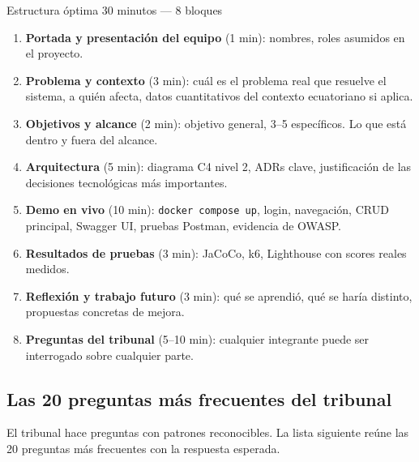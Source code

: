 \documentclass[11pt,a4paper,openany]{book}
\begin{document}
\begin{cajadefinicion}{Estructura óptima 30 minutos --- 8 bloques}
\begin{enumerate}
\item \textbf{Portada y presentación del equipo} (1 min): nombres,
roles asumidos en el proyecto.
\item \textbf{Problema y contexto} (3 min): cuál es el problema real
que resuelve el sistema, a quién afecta, datos cuantitativos del
contexto ecuatoriano si aplica.
\item \textbf{Objetivos y alcance} (2 min): objetivo general, 3--5
específicos. Lo que está dentro y fuera del alcance.
\item \textbf{Arquitectura} (5 min): diagrama C4 nivel 2, ADRs
clave, justificación de las decisiones tecnológicas más importantes.
\item \textbf{Demo en vivo} (10 min): \texttt{docker compose up},
login, navegación, CRUD principal, Swagger UI, pruebas Postman,
evidencia de OWASP.
\item \textbf{Resultados de pruebas} (3 min): JaCoCo, k6, Lighthouse
con scores reales medidos.
\item \textbf{Reflexión y trabajo futuro} (3 min): qué se aprendió,
qué se haría distinto, propuestas concretas de mejora.
\item \textbf{Preguntas del tribunal} (5--10 min): cualquier integrante
puede ser interrogado sobre cualquier parte.
\end{enumerate}
\end{cajadefinicion}

\subsection{Las 20 preguntas más frecuentes del tribunal}

El tribunal hace preguntas con patrones reconocibles. La
lista siguiente reúne las 20 preguntas más frecuentes con la
respuesta esperada.
\end{document}
